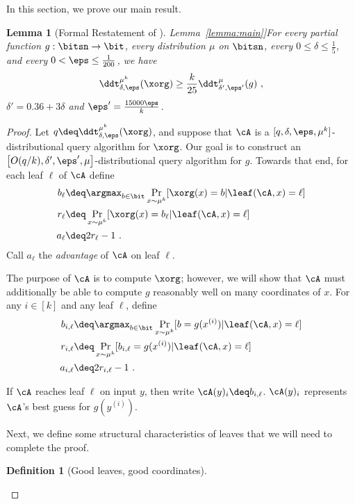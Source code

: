 \documentclass[11pt]{article}
\numberwithin{equation}{section}
\newtheorem{lemma}[theorem]{Lemma}
\theoremstyle{definition}
\newtheorem{definition}[theorem]{Definition}
\theoremstyle{plain}
\newcommand{\expref}[2]{\hyperref[#2]{#1~\ref{#2}}}
\begin{document}
In this section, we prove our main result.

\begin{lemma}[Formal Restatement of \expref{Lemma}{lemma:main}]\label{lemma:main-technical}
  For every
  partial %
  function $g: \bitsn \rightarrow \bit$, every distribution
  $\mu$ on $\bitsn$, every $0 \leq \delta \leq \frac{1}{5}$, and every
  $0 < \eps \leq \frac{1}{200}$, we
  have
  $$\ddt_{\delta,\eps}^{\mu^k}(\xorg) \geq \frac{k}{25} \ddt_{\delta',\eps'}^\mu(g)\ ,$$ %
  $\delta' = 0.36+3\delta$ and $\eps' = \frac{15000\eps}{k}$.
\end{lemma}

\begin{proof}
  Let $q \deq \ddt_{\delta,\eps}^{\mu^k}(\xorg)$, and suppose that $\cA$
  is a $[q,\delta,\eps,\mu^k]$-distributional query algorithm for
  $\xorg$.  Our goal is to construct an
  $\left[O(q/k), \delta', \eps', \mu\right]$-distributional query
  algorithm for $g$.  Towards that end, for each leaf $\ell$ of
  $\cA$ define
  \begin{align*}
    b_\ell &\deq \argmax_{b \in \bit} \Pr_{x \sim \mu^k}[\xorg(x) = b | \leaf(\cA, x) = \ell] \\
    r_\ell &\deq \Pr_{x \sim \mu^k}[\xorg(x) = b_\ell | \leaf(\cA,x) = \ell] \\
    a_\ell &\deq 2r_\ell - 1\ .
  \end{align*}
  Call $a_\ell$ the \emph{advantage} of $\cA$ on leaf $\ell$.

  The purpose of $\cA$ is to compute $\xorg$; however, %
  we will %
  show that
  $\cA$ must additionally be able to compute $g$ reasonably
  well on many coordinates of $x$.  For any $i \in [k]$ and any leaf $\ell$, define
  \begin{align*}
    b_{i,\ell} &\deq \argmax_{b \in \bit} \Pr_{x \sim \mu^k}[b = g(x^{(i)}) | \leaf(\cA,x) = \ell] \\
    r_{i,\ell} &\deq \Pr_{x\sim \mu^k}[b_{i,\ell} = g(x^{(i)}) | \leaf(\cA,x) = \ell] \\
    a_{i,\ell} &\deq 2r_{i,\ell} - 1\ .
  \end{align*}

  If $\cA$ reaches leaf $\ell$ on input $y$, then write $\cA(y)_i \deq
  b_{i,\ell}$.  $\cA(y)_i$ represents $\cA$'s best guess for $g(y^{(i)})$.

  Next, we define some structural characteristics of leaves that %
  we will %
  need to complete the proof.

  \begin{definition}[Good leaves, good coordinates]
    \mbox{ }
    

\end{definition}
\end{proof}
\end{document}
